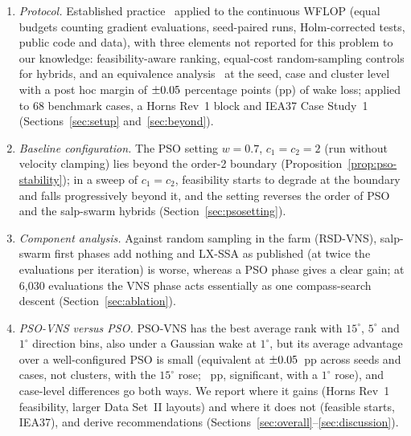 \begin{enumerate}
\item \emph{Protocol.} Established practice~\cite{Derrac2011,BartzBeielstein2020,LaTorre2021} applied to the continuous WFLOP (equal budgets counting gradient evaluations, seed-paired runs, Holm-corrected tests, public code and data), with three elements not reported for this problem to our knowledge: feasibility-aware ranking, equal-cost random-sampling controls for hybrids, and an equivalence analysis~\cite{Lakens2017,Benavoli2017} at the seed, case and cluster level with a post hoc margin of $\pm0.05$ percentage points (pp) of wake loss; applied to 68 benchmark cases, a Horns Rev~1 block and IEA37 Case Study~1 (Sections~\ref{sec:setup} and~\ref{sec:beyond}).
\item \emph{Baseline configuration.} The PSO setting $w=0.7$, $c_1=c_2=2$ (run without velocity clamping) lies beyond the order-2 boundary (Proposition~\ref{prop:pso-stability}); in a sweep of $c_1=c_2$, feasibility starts to degrade at the boundary and falls progressively beyond it, and the setting reverses the order of PSO and the salp-swarm hybrids (Section~\ref{sec:psosetting}).
\item \emph{Component analysis.} Against random sampling in the farm (RSD-VNS), salp-swarm first phases add nothing and LX-SSA as published (at twice the evaluations per iteration) is worse, whereas a PSO phase gives a clear gain; at 6,030 evaluations the VNS phase acts essentially as one compass-search descent (Section~\ref{sec:ablation}).
\item \emph{PSO-VNS versus PSO.} PSO-VNS has the best average rank with $15^\circ$, $5^\circ$ and $1^\circ$ direction bins, also under a Gaussian wake at $1^\circ$, but its average advantage over a well-configured PSO is small (equivalent at $\pm0.05$~pp across seeds and cases, not clusters, with the $15^\circ$ rose; \NFPairMeanOne~pp, significant, with a $1^\circ$ rose), and case-level differences go both ways. We report where it gains (Horns Rev~1 feasibility, larger Data Set~II layouts) and where it does not (feasible starts, IEA37), and derive recommendations (Sections~\ref{sec:overall}--\ref{sec:discussion}).

\end{enumerate}
